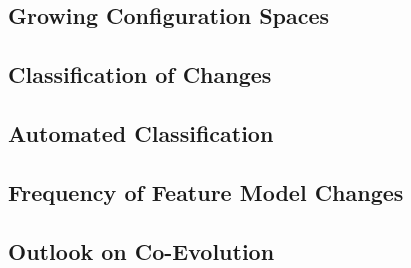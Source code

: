 \subsection{Growing Configuration Spaces}
\subsection{Classification of Changes}
\begin{frame}{\myframetitle{} }
	\begin{mycolumns}
	\mynextcolumn
	\end{mycolumns}
\end{frame}
\subsection{Automated Classification}
\subsection{Frequency of Feature Model Changes}
\subsection{Outlook on Co-Evolution}

